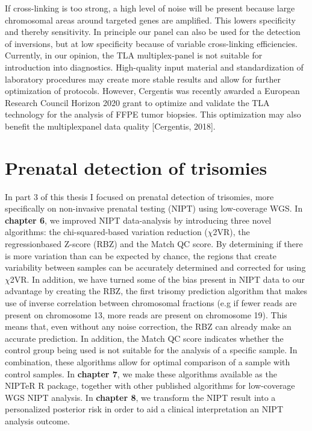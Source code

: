 If cross-linking is too strong, a high level of noise will be present because large chromosomal areas around targeted genes are amplified. 
This lowers specificity and thereby sensitivity. 
In principle our panel can also be used for the detection of inversions, but at low specificity because of variable cross-linking efficiencies. 
Currently, in our opinion, the TLA multiplex-panel is not suitable for introduction into diagnostics. 
High-quality input material and standardization of laboratory procedures may create more stable results and allow for further optimization of protocols. 
However, Cergentis was recently awarded a European Research Council Horizon 2020 grant to optimize and validate the TLA technology for the analysis of FFPE tumor biopsies. 
This optimization may also benefit the multiplexpanel data quality [Cergentis, 2018].

\section{Prenatal detection of trisomies} \label{Prenatal}
In part 3 of this thesis I focused on prenatal detection of trisomies, more specifically on non-invasive prenatal testing (NIPT) using low-coverage WGS. 
In \textbf{chapter 6}, we improved NIPT data-analysis by introducing three novel algorithms: the chi-squared-based variation reduction ($\chi$2VR), the regressionbased Z-score (RBZ) and the Match QC score. 
By determining if there is more variation than can be expected by chance, the regions that create variability between samples can be accurately determined and corrected for using $\chi$2VR.
In addition, we have turned some of the bias present in NIPT data to our advantage by creating the RBZ, the first trisomy prediction algorithm that makes use of inverse correlation between chromosomal fractions (e.g if fewer reads are present on chromosome 13, more reads are present on chromosome 19).
This means that, even without any noise correction, the RBZ can already make an accurate prediction. 
In addition, the Match QC score indicates whether the control group being used is not suitable for the analysis of a specific sample. 
In combination, these algorithms allow for optimal comparison of a sample with control samples. 
In \textbf{chapter 7}, we make these algorithms available as the NIPTeR R package, together with other published algorithms for low-coverage WGS NIPT analysis. 
In \textbf{chapter 8}, we transform the NIPT result into a personalized posterior risk in order to aid a clinical interpretation an NIPT analysis outcome.

